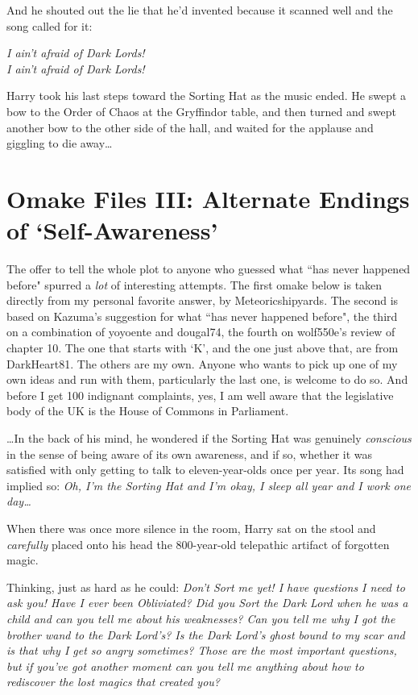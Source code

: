 And he shouted out the lie that he'd invented because it scanned well and the song called for it:

\begin{center}
\emph{I ain't afraid of Dark Lords!\\
I ain't afraid of Dark Lords!}
\end{center}

Harry took his last steps toward the Sorting Hat as the music ended. He swept a bow to the Order of Chaos at the Gryffindor table, and then turned and swept another bow to the other side of the hall, and waited for the applause and giggling to die away{\ldots}

\section{Omake Files III: Alternate Endings of `Self-Awareness'}

The offer to tell the whole plot to anyone who guessed what ``has never happened before" spurred a \emph{lot} of interesting attempts. The first omake below is taken directly from my personal favorite answer, by Meteoricshipyards. The second is based on Kazuma's suggestion for what ``has never happened before", the third on a combination of yoyoente and dougal74, the fourth on wolf550e's review of chapter 10. The one that starts with `K', and the one just above that, are from DarkHeart81. The others are my own. Anyone who wants to pick up one of my own ideas and run with them, particularly the last one, is welcome to do so. And before I get 100 indignant complaints, yes, I am well aware that the legislative body of the UK is the House of Commons in Parliament.

\later

{\ldots}In the back of his mind, he wondered if the Sorting Hat was genuinely \emph{conscious} in the sense of being aware of its own awareness, and if so, whether it was satisfied with only getting to talk to eleven-year-olds once per year. Its song had implied so: \emph{Oh, I'm the Sorting Hat and I'm okay, I sleep all year and I work one day{\ldots}}

When there was once more silence in the room, Harry sat on the stool and \emph{carefully} placed onto his head the 800-year-old telepathic artifact of forgotten magic.

Thinking, just as hard as he could: \emph{Don't Sort me yet! I have questions I need to ask you! Have I ever been Obliviated? Did you Sort the Dark Lord when he was a child and can you tell me about his weaknesses? Can you tell me why I got the brother wand to the Dark Lord's? Is the Dark Lord's ghost bound to my scar and is that why I get so angry sometimes? Those are the most important questions, but if you've got another moment can you tell me anything about how to rediscover the lost magics that created you?}

